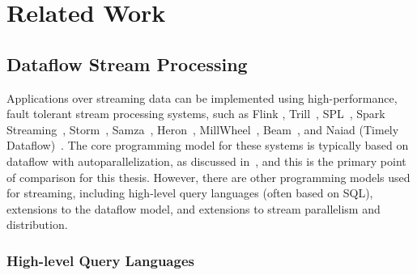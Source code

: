 \chapter{Related Work}
\label{cha:rw}


\section{Dataflow Stream Processing}

Applications over streaming data can be implemented using
high-performance, fault tolerant stream processing systems, such as
Flink \cite{Flink2015,Flink2017,Flink}, Trill~\cite{chandramouli2014trill},
SPL~\cite{HAG2013SPL},
Spark Streaming~\cite{Spark2013,SparkStreaming}, Storm~\cite{Storm},
Samza~\cite{Samza2017}, Heron~\cite{kulkarni2015twitter-heron,Heron},
MillWheel~\cite{MillWheel},
Beam~\cite{Beam},
and Naiad (Timely Dataflow)~\cite{Naiad2013,Timely}.
The core programming model for these systems is typically based on dataflow with autoparallelization, as discussed in~,
and this is the primary point of comparison for this thesis.
However, there are other programming models used for streaming, including
high-level query languages (often based on SQL),
extensions to the dataflow model,
and extensions to stream parallelism and distribution.


\subsection{High-level Query Languages}

